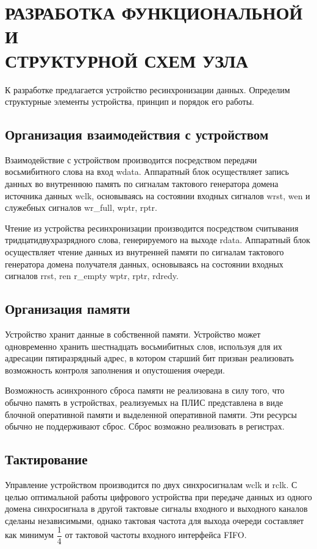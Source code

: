 \newcommand{\erdatamodaler}{ERwin Data Modeler~}

\chapter{РАЗРАБОТКА ФУНКЦИОНАЛЬНОЙ И \\СТРУКТУРНОЙ СХЕМ УЗЛА}

К разработке предлагается устройство ресинхронизации данных. Определим структурные элементы устройства, принцип и порядок его работы.

\section{Организация взаимодействия с устройством}
Взаимодействие с устройством производится посредством передачи восьмибитного слова на вход wdata. Аппаратный блок осуществляет запись данных во внутреннюю память по сигналам тактового генератора домена источника данных wclk, основываясь на состоянии входных сигналов wrst, wen и служебных сигналов wr\_full,  wptr, rptr.

Чтение из устройства ресинхронизации производится посредством считывания тридцатидвухразрядного слова, генерируемого на выходе rdata. Аппаратный блок осуществляет чтение данных из внутренней памяти по сигналам тактового генератора домена получателя данных, основываясь на состоянии входных сигналов rrst, ren  r\_empty wptr, rptr, rdredy.

\section{Организация памяти}

Устройство хранит данные в собственной памяти. Устройство может одновременно хранить шестнадцать восьмибитных слов, используя для их адресации пятиразрядный адрес, в котором старший бит призван реализовать возможность контроля заполнения и опустошения очереди. 

Возможность асинхронного сброса памяти не реализована в силу того, что обычно память в устройствах, реализуемых на ПЛИС представлена в виде блочной оперативной памяти и выделенной оперативной памяти. Эти ресурсы обычно не поддерживают сброс. Сброс возможно реализовать в регистрах. 



\section{Тактирование}
Управление устройством производится по двух синхросигналам wclk и rclk. С целью оптимальной работы цифрового устройства при передаче данных из одного домена синхросигнала в другой тактовые сигналы входного и выходного каналов сделаны независимыми, однако тактовая частота для выхода очереди составляет как минимум $\dfrac14$ от тактовой частоты входного интерфейса FIFO.

